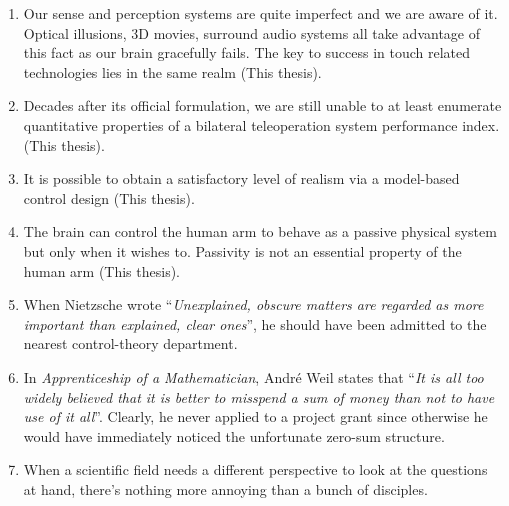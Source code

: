 \documentclass[10pt]{article}%
\newcommand{\mystelling}[1]{%
\item #1
}%
\begin{document}


%
%
%
%
%
\begin{enumerate}
\mystelling{Our sense and perception systems are quite imperfect and we are aware of it. Optical illusions, 
3D movies, surround audio systems all take advantage of this fact as our brain gracefully fails. The key to success 
in touch related technologies lies in the same realm (This thesis).} 

\mystelling{Decades after its official formulation, we are still unable to at least enumerate quantitative 
properties of a bilateral teleoperation system performance index. (This thesis).}

\mystelling{It is possible to obtain a satisfactory level of realism via a model-based control design (This thesis).}

\mystelling{The brain can control the human arm to behave as a passive physical system but only when it 
wishes to. Passivity is not an essential property of the human arm (This thesis).}

\mystelling{When Nietzsche wrote \enquote{\emph{Unexplained, obscure matters are regarded 
as more important than explained, clear ones}}, he should have been admitted to the 
nearest control-theory department.}

\mystelling{In \emph{Apprenticeship of a Mathematician}, Andr\'{e} Weil states that 
\enquote{\emph{It is all too widely believed that it is better to misspend a sum of 
money than not to have use of it all}}. Clearly, he never applied to a project grant
since otherwise he would have immediately noticed the unfortunate zero-sum structure.
}

\mystelling{When a scientific field needs a different perspective to look at the questions 
at hand, there's nothing more annoying than a bunch of disciples.}


\end{enumerate}
\end{document}
